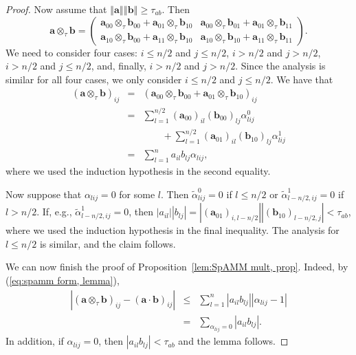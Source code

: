 \documentclass[letterpaper,twocolumn,amsmath,amsfont,amssymb,english,aps,jcp,preprintnumbers,groupaddress,nofootinbib,tightenlines,floatfix]{revtex4}
\newcommand{\mat}[1]{\boldsymbol{#1}}
\newcommand{\ot}{  {\scriptstyle \otimes}_{ \tau } }
\theoremstyle{plain}
\theoremstyle{remark}
\theoremstyle{plain}
\begin{document}
\begin{proof}
Now assume that $\left\Vert \mat{a}\right\Vert \left\Vert \mat{b}\right\Vert \geq\tau_{ab}$.
Then
\[
\mat{a} \ot \mat{b}=\left(\begin{array}{cc}
\mat{a}_{00}\ot \mat{b}_{00}+\mat{a}_{01}\ot \mat{b}_{10} & \mat{a}_{00}\ot \mat{b}_{01}+\mat{a}_{01}\ot \mat{b}_{11}\\
\mat{a}_{10}\ot \mat{b}_{00}+\mat{a}_{11}\ot \mat{b}_{10} & \mat{a}_{10}\ot \mat{b}_{10}+\mat{a}_{11}\ot \mat{b}_{11}
\end{array}\right).
\]
We need to consider four cases: $i\leq n/2$ and $j\leq n/2$, $i>n/2$
and $j>n/2$, $i>n/2$ and $j\leq n/2$, and, finally, $i>n/2$ and
$j>n/2$. Since the analysis is similar for all four cases, we only
consider $i\leq n/2$ and $j\leq n/2$. We have that 
\begin{eqnarray*}
\left( \mat{a} \ot \mat{b}\right)_{ij} & = & \left( \mat{a}_{00} \ot \mat{b}_{00}+\mat{a}_{01}\ot \mat{b}_{10}\right)_{ij}\\
 & = & \sum_{l=1}^{n/2}\left(\mat{a}_{00}\right)_{il}\left(\mat{b}_{00}\right)_{lj}\alpha_{lij}^{0}  \\
 &   & \qquad + \sum_{l=1}^{n/2}\left(\mat{a}_{01}\right)_{il}\left(\mat{b}_{10}\right)_{lj}\alpha_{lij}^{1}\\
 & = & \sum_{l=1}^{n}a_{il}b_{lj}\alpha_{lij},
\end{eqnarray*}
where we used the induction hypothesis in the second equality.

Now suppose that $\alpha_{lij}=0$ for some $l$. Then $\tilde{\alpha}_{lij}^{0}=0$
if $l\leq n/2$ or $\tilde{\alpha}_{l-n/2,ij}^{1}=0$ if $l>n/2$.
If, e.g., $\tilde{\alpha}_{l-n/2,ij}^{1}=0$, then 
$\left|a_{il}\right|\left|b_{lj}\right|=\left|\left(\mat{a}_{01}\right)_{i,l-n/2}\right|\left|\left(\mat{b}_{10}\right)_{l-n/2,j}\right|<\tau_{ab}$,
where we used the induction hypothesis in the final inequality. The
analysis for $l\leq n/2$ is similar, and the claim
follows.

We can now finish the proof of Proposition~\ref{lem:SpAMM mult, prop}. Indeed, by (\ref{eq:spamm form, lemma}),
\begin{eqnarray*}
\left|\left( \mat{a} \ot \mat{b}\right)_{ij}-\left( \mat{a} \cdot \mat{b} \right)_{ij}\right| 
& \leq & \sum_{l=1}^{n} \left| a_{il}b_{lj} \right|   \left| \alpha_{lij}-1 \right|   \\
& = & \sum_{\alpha_{lij}=0}\left|a_{il}b_{lj}\right|.
\end{eqnarray*}
In addition, if $\alpha_{lij}=0$, then $\left|a_{il}b_{lj}\right|<\tau_{ab}$
and the lemma follows.

\end{proof}
\end{document}

